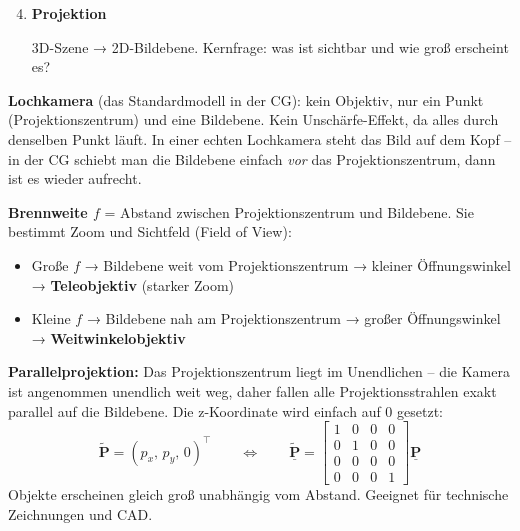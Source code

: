\documentclass[12pt, a4paper]{article}
\begin{document}
\begin{enumerate}
  \setcounter{enumi}{3}

  \item \textbf{Projektion}

  3D-Szene → 2D-Bildebene. Kernfrage: was ist sichtbar und wie groß erscheint es?

\end{enumerate}


\textbf{Lochkamera} (das Standardmodell in der CG): kein Objektiv, nur ein Punkt (Projektionszentrum) und eine Bildebene. Kein Unschärfe-Effekt, da alles durch denselben Punkt läuft. In einer echten Lochkamera steht das Bild auf dem Kopf -- in der CG schiebt man die Bildebene einfach \textit{vor} das Projektionszentrum, dann ist es wieder aufrecht.

\textbf{Brennweite $f$} = Abstand zwischen Projektionszentrum und Bildebene. Sie bestimmt Zoom und Sichtfeld (Field of View):
\begin{itemize}
  \item Große $f$ → Bildebene weit vom Projektionszentrum → kleiner Öffnungswinkel → \textbf{Teleobjektiv} (starker Zoom)
  \item Kleine $f$ → Bildebene nah am Projektionszentrum → großer Öffnungswinkel → \textbf{Weitwinkelobjektiv}
\end{itemize}

\textbf{Parallelprojektion:} Das Projektionszentrum liegt im Unendlichen -- die Kamera ist angenommen unendlich weit weg, daher fallen alle Projektionsstrahlen exakt parallel auf die Bildebene. Die z-Koordinate wird einfach auf 0 gesetzt:
\[
  \tilde{\mathbf{P}} = (p_x,\, p_y,\, 0)^\top
  \qquad \Leftrightarrow \qquad
  \tilde{\underline{\mathbf{P}}} =
  \begin{bmatrix}1&0&0&0\\0&1&0&0\\0&0&0&0\\0&0&0&1\end{bmatrix}
  \underline{\mathbf{P}}
\]
Objekte erscheinen gleich groß unabhängig vom Abstand. Geeignet für technische Zeichnungen und CAD.
\end{document}
